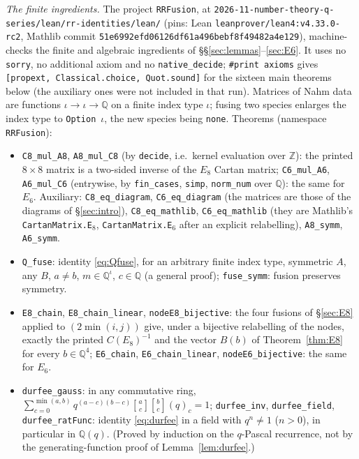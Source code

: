 \documentclass[11pt]{amsart}
\theoremstyle{definition}
\numberwithin{equation}{section}
\newcommand{\Z}{\mathbb{Z}}
\newcommand{\Q}{\mathbb{Q}}
\newcommand{\qbin}[2]{\genfrac{[}{]}{0pt}{}{#1}{#2}}
\newcommand{\repo}{\nolinkurl{2026-11-number-theory-q-series/}}
\newcommand{\fpath}[1]{\nolinkurl{#1}}
\begin{document}
\emph{The finite ingredients.} The project \fpath{RRFusion}, at \repo\fpath{lean/rr-identities/lean/} (pins: Lean \texttt{leanprover/lean4:v4.33.0-rc2}, Mathlib
commit \texttt{51e6992efd06\allowbreak126df61a496bebf8\allowbreak f49482a4e129}), machine-checks the finite and algebraic
ingredients of §§\ref{sec:lemmas}--\ref{sec:E6}. It uses no \texttt{sorry}, no additional axiom and no
\texttt{native\_decide}; \verb|#print axioms| gives \texttt{[propext, Classical.choice, Quot.sound]} for
the sixteen main theorems below (the auxiliary ones were not included in that run). Matrices of Nahm data are functions $\iota\to\iota\to\Q$ on a finite index type
$\iota$; fusing two species enlarges the index type to \texttt{Option}~$\iota$, the new species being
\texttt{none}.
Theorems (namespace \texttt{RRFusion}):
\begin{itemize}[leftmargin=1.5em]
\item \texttt{C8\_mul\_A8}, \texttt{A8\_mul\_C8} (by \texttt{decide}, i.e.\ kernel evaluation over $\Z$): the
printed $8\times8$ matrix is a two-sided inverse of the $E_8$ Cartan matrix; \texttt{C6\_mul\_A6},
\texttt{A6\_mul\_C6} (entrywise, by \texttt{fin\_cases}, \texttt{simp}, \texttt{norm\_num} over $\Q$): the same for
$E_6$. Auxiliary: \texttt{C8\_eq\_diagram}, \texttt{C6\_eq\_diagram} (the matrices are those of the diagrams
of §\ref{sec:intro}), \texttt{C8\_eq\_mathlib}, \texttt{C6\_eq\_mathlib} (they are Mathlib's
\texttt{CartanMatrix.E}$_8$, \texttt{CartanMatrix.E}$_6$ after an explicit relabelling), \texttt{A8\_symm},
\texttt{A6\_symm}.
\item \texttt{Q\_fuse}: identity \eqref{eq:Qfuse}, for an arbitrary finite index type, symmetric $A$, any
$B$, $a\ne b$, $m\in\Q^\iota$, $c\in\Q$ (a general proof); \texttt{fuse\_symm}: fusion preserves symmetry.
\item \texttt{E8\_chain}, \texttt{E8\_chain\_linear}, \texttt{nodeE8\_bijective}: the four fusions of
§\ref{sec:E8} applied to $(2\min(i,j))$ give, under a bijective relabelling of the nodes, exactly the printed
$C(E_8)^{-1}$ and the vector $B(b)$ of Theorem~\ref{thm:E8} for every $b\in\Q^4$; \texttt{E6\_chain},
\texttt{E6\_chain\_linear}, \texttt{nodeE6\_bijective}: the same for $E_6$.
\item \texttt{durfee\_gauss}: in any commutative ring,
$\sum_{c=0}^{\min(a,b)}q^{(a-c)(b-c)}\qbin ac\qbin bc(q)_c=1$; \texttt{durfee\_inv}, \texttt{durfee\_field},
\texttt{durfee\_ratFunc}: identity \eqref{eq:durfee} in a field with $q^n\ne1$ ($n>0$), in particular in
$\Q(q)$. (Proved by induction on the $q$-Pascal recurrence, not by the generating-function proof of
Lemma~\ref{lem:durfee}.)
\end{itemize}
\end{document}
